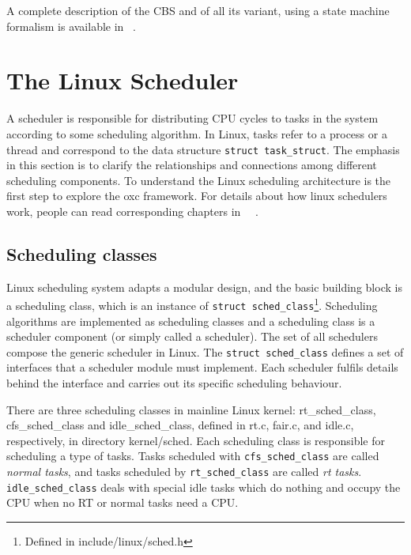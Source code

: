 A complete description of the CBS and of all its variant, using a
state machine formalism is available in
~\cite{DBLP:journals/rts/MancinaFLHGT09}.

%
%

\section{The Linux Scheduler\label{sec:LinuxSched}}

A scheduler is responsible for distributing CPU cycles to tasks in the
system according to some scheduling algorithm. In Linux, tasks refer
to a process or a thread and correspond to the data structure
\texttt{struct task\_struct}. The emphasis in this section is to
clarify the relationships and connections among different scheduling
components. %
To understand the Linux scheduling architecture is the
first step to explore the oxc framework. For details about how linux
schedulers work, people can read corresponding chapters in~\cite{Wolf}
~\cite{R.Love}.

\subsection{Scheduling classes\label{sec:LinuxSched_classes}}

Linux scheduling system adapts a modular design, and the basic
building block is a scheduling class, which is an instance of
\texttt{struct sched\_class}\footnote{Defined in
  include/linux/sched.h}. Scheduling algorithms are implemented as
scheduling classes and a scheduling class is a scheduler component (or
simply called a scheduler). The set of all schedulers compose the
generic scheduler in Linux.  The \texttt{struct sched\_class} defines
a set of interfaces that a scheduler module must implement. Each
scheduler fulfils details behind the interface and carries out its
specific scheduling behaviour.

There are three scheduling classes in mainline Linux kernel:
rt\_sched\_class, cfs\_sched\_class and idle\_sched\_class, defined in
rt.c, fair.c, and idle.c, respectively, in directory
kernel/sched. Each scheduling class is responsible for scheduling a
type of tasks. Tasks scheduled with \texttt{cfs\_sched\_class} are
called \emph{normal tasks}, and tasks scheduled by
\texttt{rt\_sched\_class} are called \emph{rt tasks}.
\texttt{idle\_sched\_class} deals with special idle tasks which do
nothing and occupy the CPU when no RT or normal tasks need a CPU.

